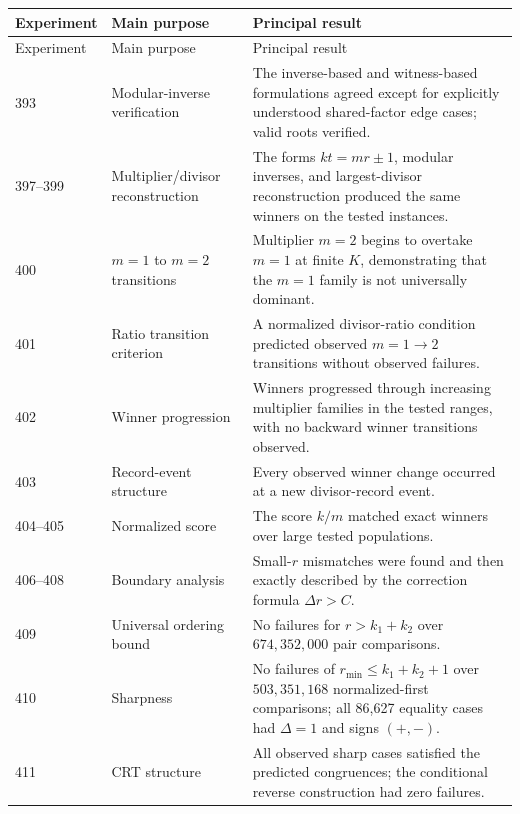 \documentclass[11pt,a4paper]{article}
\begin{document}
\begin{longtable}{@{}p{}p{}p{}@{}}
\toprule
Experiment & Main purpose & Principal result \\
\midrule
\endfirsthead
\toprule
Experiment & Main purpose & Principal result \\
\midrule
\endhead
\bottomrule
\endfoot

393 & Modular-inverse verification & The inverse-based and witness-based formulations agreed except for explicitly understood shared-factor edge cases; valid roots verified. \\

397--399 & Multiplier/divisor reconstruction & The forms $kt=mr\pm1$, modular inverses, and largest-divisor reconstruction produced the same winners on the tested instances. \\

400 & $m=1$ to $m=2$ transitions & Multiplier $m=2$ begins to overtake $m=1$ at finite $K$, demonstrating that the $m=1$ family is not universally dominant. \\

401 & Ratio transition criterion & A normalized divisor-ratio condition predicted observed $m=1\to2$ transitions without observed failures. \\

402 & Winner progression & Winners progressed through increasing multiplier families in the tested ranges, with no backward winner transitions observed. \\

403 & Record-event structure & Every observed winner change occurred at a new divisor-record event. \\

404--405 & Normalized score & The score $k/m$ matched exact winners over large tested populations. \\

406--408 & Boundary analysis & Small-$r$ mismatches were found and then exactly described by the correction formula $\Delta r>C$. \\

409 & Universal ordering bound & No failures for $r>k_1+k_2$ over $674{,}352{,}000$ pair comparisons. \\

410 & Sharpness & No failures of $r_{\min}\le k_1+k_2+1$ over $503{,}351{,}168$ normalized-first comparisons; all 86,627 equality cases had $\Delta=1$ and signs $(+,-)$. \\

411 & CRT structure & All observed sharp cases satisfied the predicted congruences; the conditional reverse construction had zero failures. \\

\end{longtable}
\end{document}
